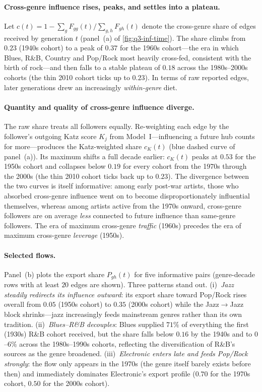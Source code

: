 \paragraph{Cross-genre influence rises, peaks, and settles into a
plateau.} Let
$c(t)=1-\sum_g F_{gg}(t)\big/\sum_{g,h}F_{gh}(t)$ denote the cross-genre
share of edges received by generation $t$ (panel~(a) of
\cref{fig:q3-inf-time}). The share climbs from $0.23$ (1940s cohort) to a
peak of $0.37$ for the 1960s cohort---the era in which Blues, R\&B,
Country and Pop/Rock most heavily cross-fed, consistent with the birth of
rock---and then falls to a stable plateau of $0.18$ across the
1980s--2000s cohorts (the thin 2010 cohort ticks up to $0.23$). In terms
of raw reported edges, later generations drew an increasingly
\emph{within-genre} diet.

\paragraph{Quantity and quality of cross-genre influence diverge.} The raw
share treats all followers equally. Re-weighting each edge by the
follower's outgoing Katz score $K_j$ from Model~I---influencing a future
hub counts for more---produces the Katz-weighted share $c_K(t)$ (blue
dashed curve of panel~(a)). Its maximum shifts a full decade earlier:
$c_K(t)$ peaks at $0.53$ for the 1950s cohort and collapses below $0.19$
for every cohort from the 1970s through the 2000s (the thin 2010 cohort
ticks back up to $0.23$). The divergence between the two curves is itself
informative: among early post-war artists, those who absorbed cross-genre
influence went on to become disproportionately influential themselves,
whereas among artists active from the 1970s onward, cross-genre followers
are on average \emph{less} connected to future influence than same-genre
followers. The era of maximum cross-genre \emph{traffic} (1960s) precedes
the era of maximum cross-genre \emph{leverage} (1950s).

\paragraph{Selected flows.} Panel~(b) plots the export share $P_{gh}(t)$
for five informative pairs (genre-decade rows with at least $20$ edges are
shown). Three patterns stand out.
(i)~\emph{Jazz steadily redirects its influence outward}: its export
share toward Pop/Rock rises overall from $0.05$ (1950s cohort) to $0.35$
(2000s cohort) while the Jazz$\to$Jazz block shrinks---jazz increasingly
feeds mainstream genres rather than its own tradition.
(ii)~\emph{Blues--R\&B decouples}: Blues supplied $71\%$ of everything
the first (1930s) R\&B cohort received, but the share falls below $0.16$
by the 1940s and to $0$--$6\%$ across the 1980s--1990s cohorts, reflecting
the diversification of R\&B's sources as the genre broadened.
(iii)~\emph{Electronic enters late and feeds Pop/Rock strongly}: the flow
only appears in the 1970s (the genre itself barely exists before then) and
immediately dominates Electronic's export profile ($0.70$ for the 1970s
cohort, $0.50$ for the 2000s cohort).

